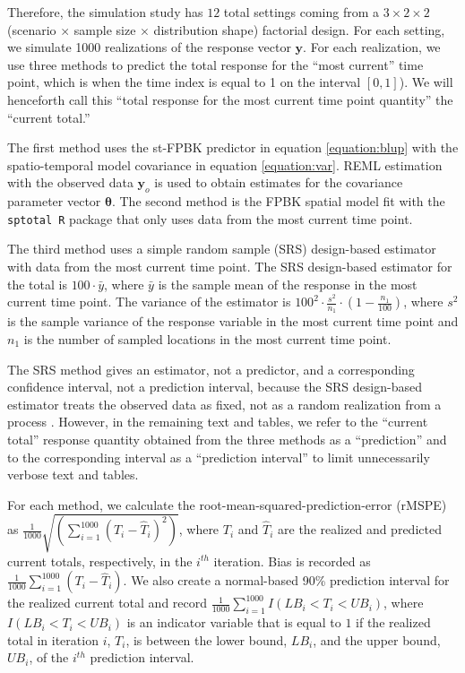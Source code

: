 \documentclass[]{interact}
\theoremstyle{plain}%
\theoremstyle{definition}
\theoremstyle{remark}
\begin{document}
Therefore, the simulation study has \(12\) total settings coming from a
\(3 \times 2 \times 2\) (scenario \(\times\) sample size \(\times\)
distribution shape) factorial design. For each setting, we simulate 1000
realizations of the response vector \(\mathbf{y}\). For each
realization, we use three methods to predict the total response for the
``most current'' time point, which is when the time index is equal to 1
on the interval \([0, 1]\)). We will henceforth call this ``total
response for the most current time point quantity'' the ``current
total.''

The first method uses the st-FPBK predictor in equation
\ref{equation:blup} with the spatio-temporal model covariance in
equation \ref{equation:var}. REML estimation with the observed data
\(\mathbf{y}_o\) is used to obtain estimates for the covariance
parameter vector \(\bm{\theta}\). The second method is the FPBK spatial
model fit with the \texttt{sptotal R} package \citep{higham2021sptotal}
that only uses data from the most current time point.

The third method uses a simple random sample (SRS) design-based
estimator with data from the most current time point. The SRS
design-based estimator for the total is \(100 \cdot \bar{y}\), where
\(\bar{y}\) is the sample mean of the response in the most current time
point. The variance of the estimator \citep{lohr2021sampling} is
\(100^2 \cdot \frac{s^2}{n_1} \cdot (1 - \frac{n_1}{100})\), where
\(s^2\) is the sample variance of the response variable in the most
current time point and \(n_1\) is the number of sampled locations in the
most current time point.

The SRS method gives an estimator, not a predictor, and a corresponding
confidence interval, not a prediction interval, because the SRS
design-based estimator treats the observed data as fixed, not as a
random realization from a process
\citep{brus2021statistical, dumelle2022comparison}. However, in the
remaining text and tables, we refer to the ``current total'' response
quantity obtained from the three methods as a ``prediction'' and to the
corresponding interval as a ``prediction interval'' to limit
unnecessarily verbose text and tables.

For each method, we calculate the root-mean-squared-prediction-error
(rMSPE) as
\(\frac{1}{1000}\sqrt{(\sum_{i = 1}^{1000}(T_i - \hat{T}_i)^2)}\), where
\(T_i\) and \(\hat{T}_i\) are the realized and predicted current totals,
respectively, in the \(i^{th}\) iteration. Bias is recorded as
\(\frac{1}{1000}\sum_{i = 1}^{1000}(T_i - \hat{T}_i)\). We also create a
normal-based 90\% prediction interval for the realized current total and
record \(\frac{1}{1000} \sum_{i = 1}^{1000}I(LB_i < T_i < UB_i)\), where
\(I(LB_i < T_i < UB_i)\) is an indicator variable that is equal to \(1\)
if the realized total in iteration \(i\), \(T_i\), is between the lower
bound, \(LB_i\), and the upper bound, \(UB_i\), of the \(i^{th}\)
prediction interval.
\end{document}
